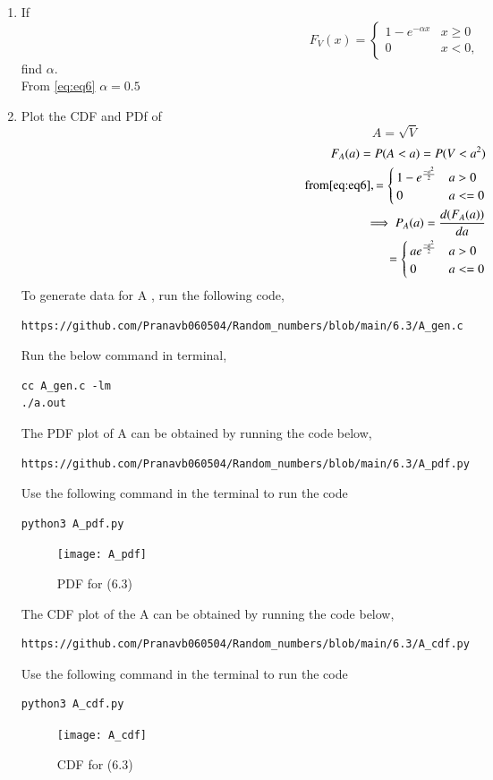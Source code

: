 \documentclass[journal,12pt,twocolumn]{IEEEtran}
\renewcommand\thesection{\arabic{section}}
\begin{document}
\begin{enumerate}[label=\thesection.\arabic*
,ref=\thesection.\theenumi]
%
\item
If
\begin{equation}
F_{V}(x) = 
\begin{cases}
1 - e^{-\alpha x} & x \geq 0 \\
0 & x < 0,
\end{cases}
\end{equation}
find $\alpha$.
\\
\solution 
From \eqref{eq:eq6} $\alpha=0.5$
%
\item
\label{ch3_raleigh_sim}
Plot the CDF and PDf of
%
\begin{equation}
A = \sqrt{V}
\end{equation}
%
\solution
\begin{align}
F_{A}(a)=P(A<a)=P(V<a^{2})\\
\text{from} \eqref{eq:eq6}, 
=\begin{cases}
1-e^{\frac{-a^{2}}{2}} & a>0\\
0 & a<=0
\end{cases}
\\
\implies P_{A}(a)= \frac{d(F_{A}(a))}{da}\\
=\begin{cases}
ae^{\frac{-a^{2}}{2}} & a>0\\
0 & a<=0
\end{cases}
\end{align}
To generate data for A , run the following code,
\begin{lstlisting}
https://github.com/Pranavb060504/Random_numbers/blob/main/6.3/A_gen.c
\end{lstlisting}
Run the below command in terminal,
\begin{lstlisting}
cc A_gen.c -lm
./a.out
\end{lstlisting}
The PDF plot of A can be obtained by running the code below,
\begin{lstlisting}
https://github.com/Pranavb060504/Random_numbers/blob/main/6.3/A_pdf.py
\end{lstlisting}
Use the following command in the terminal to run the code
\begin{lstlisting}
python3 A_pdf.py
\end{lstlisting}
\begin{figure}[h]
\texttt{[image: A\_pdf]}
\caption{PDF for (6.3)}
\label{fig:A_PDF}
\end{figure}
The CDF plot of the A can be obtained by running the code below,
\begin{lstlisting}
https://github.com/Pranavb060504/Random_numbers/blob/main/6.3/A_cdf.py
\end{lstlisting}
Use the following command in the terminal to run the code
\begin{lstlisting}
python3 A_cdf.py
\end{lstlisting}
\begin{figure}[h]
\texttt{[image: A\_cdf]}
\caption{CDF for (6.3)}
\label{fig:A_PDF}
\end{figure}
\end{enumerate}
\end{document}
